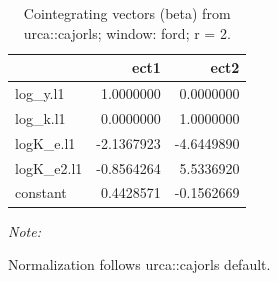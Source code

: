 \begin{table}[!h]
\centering
\caption{Cointegrating vectors (beta) from urca::cajorls; window: ford; r = 2.}
\centering
\begin{threeparttable}
\begin{tabular}[t]{lrr}
\toprule
  & ect1 & ect2\\
\midrule
log\_y.l1 & 1.0000000 & 0.0000000\\
log\_k.l1 & 0.0000000 & 1.0000000\\
logK\_e.l1 & -2.1367923 & -4.6449890\\
logK\_e2.l1 & -0.8564264 & 5.5336920\\
constant & 0.4428571 & -0.1562669\\
\bottomrule
\end{tabular}
\begin{tablenotes}
\item \textit{Note: } 
\item Normalization follows urca::cajorls default.
\end{tablenotes}
\end{threeparttable}
\end{table}
